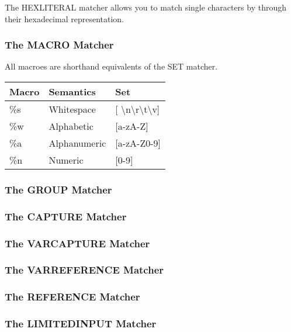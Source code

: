 The HEXLITERAL matcher allows you to match single characters by
through their hexadecimal representation.

\subsubsection{The MACRO Matcher}

All macroes are shorthand equivalents of the SET matcher.

\begin{center}
\caption{Naigama Macroes}
\label{tab:naig_macroes}
\begin{longtable}{lll}
\textbf{Macro} & \textbf{Semantics} & \textbf{Set} \\
\endhead
\%s & Whitespace & [ \textbackslash n\textbackslash r\textbackslash t\textbackslash v] \\
\%w & Alphabetic & [a-zA-Z] \\
\%a & Alphanumeric & [a-zA-Z0-9] \\
\%n & Numeric & [0-9] \\
\end{longtable}
\end{center}

\subsubsection{The GROUP Matcher}

\subsubsection{The CAPTURE Matcher}

\subsubsection{The VARCAPTURE Matcher}

\subsubsection{The VARREFERENCE Matcher}

\subsubsection{The REFERENCE Matcher}

\subsubsection{The LIMITEDINPUT Matcher}

